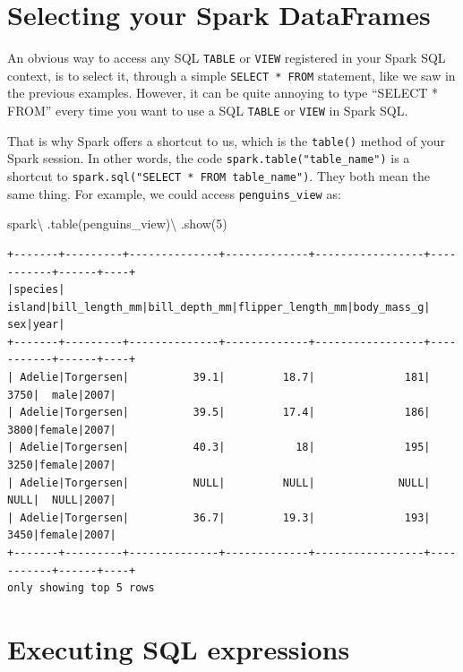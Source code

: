 \documentclass[
  11pt,
  letterpaper,
  DIV=11,
  numbers=noendperiod]{scrreprt}
\newenvironment{Shaded}{\begin{snugshade}}{\end{snugshade}}
\newcommand{\DecValTok}[1]{\textcolor[rgb]{0.68,0.00,0.00}{#1}}
\newcommand{\NormalTok}[1]{\textcolor[rgb]{0.00,0.23,0.31}{#1}}
\newcommand{\OperatorTok}[1]{\textcolor[rgb]{0.37,0.37,0.37}{#1}}
\newcommand{\StringTok}[1]{\textcolor[rgb]{0.13,0.47,0.30}{#1}}
\begin{document}
\hypertarget{selecting-your-spark-dataframes}{%
\section{Selecting your Spark
DataFrames}\label{selecting-your-spark-dataframes}}

An obvious way to access any SQL \texttt{TABLE} or \texttt{VIEW}
registered in your Spark SQL context, is to select it, through a simple
\texttt{SELECT\ *\ FROM} statement, like we saw in the previous
examples. However, it can be quite annoying to type ``SELECT * FROM''
every time you want to use a SQL \texttt{TABLE} or \texttt{VIEW} in
Spark SQL.

That is why Spark offers a shortcut to us, which is the \texttt{table()}
method of your Spark session. In other words, the code
\texttt{spark.table("table\_name")} is a shortcut to
\texttt{spark.sql("SELECT\ *\ FROM\ table\_name")}. They both mean the
same thing. For example, we could access \texttt{penguins\_view} as:

\begin{Shaded}
\begin{Highlighting}[]
\NormalTok{spark}\OperatorTok{\textbackslash{}}
\NormalTok{  .table(}\StringTok{\textquotesingle{}penguins\_view\textquotesingle{}}\NormalTok{)}\OperatorTok{\textbackslash{}}
\NormalTok{  .show(}\DecValTok{5}\NormalTok{)}
\end{Highlighting}
\end{Shaded}

\begin{verbatim}
+-------+---------+--------------+-------------+-----------------+-----------+------+----+
|species|   island|bill_length_mm|bill_depth_mm|flipper_length_mm|body_mass_g|   sex|year|
+-------+---------+--------------+-------------+-----------------+-----------+------+----+
| Adelie|Torgersen|          39.1|         18.7|              181|       3750|  male|2007|
| Adelie|Torgersen|          39.5|         17.4|              186|       3800|female|2007|
| Adelie|Torgersen|          40.3|           18|              195|       3250|female|2007|
| Adelie|Torgersen|          NULL|         NULL|             NULL|       NULL|  NULL|2007|
| Adelie|Torgersen|          36.7|         19.3|              193|       3450|female|2007|
+-------+---------+--------------+-------------+-----------------+-----------+------+----+
only showing top 5 rows
\end{verbatim}

\hypertarget{executing-sql-expressions}{%
\section{Executing SQL expressions}\label{executing-sql-expressions}}
\end{document}
